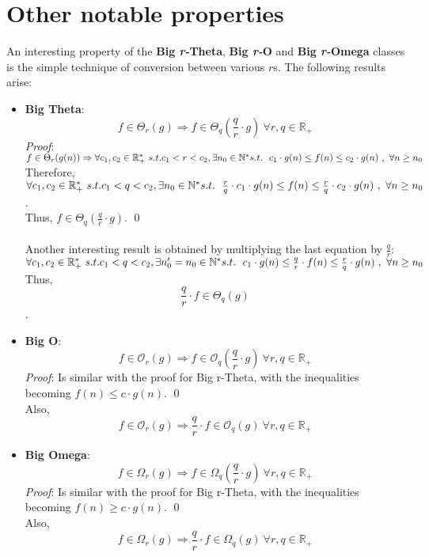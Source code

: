 \section{Other notable properties}
An interesting property of the \textbf{Big \textit{r-}Theta},  \textbf{Big \textit{r-}O} and \textbf{Big \textit{r-}Omega} classes is the simple technique of conversion between various $r$s. The following results arise:
\begin{itemize}
  \item \textbf{Big Theta}: 
 \[  f \in \Theta_{r}(g) \Rightarrow f \in \Theta_{q} \left( \frac{q}{r} \cdot g \right) \ \forall r,q \in \mathbb{R}_{+}\]
\textit{Proof}:
$ f \in \Theta_{r}(g(n)) \Rightarrow \forall c_{1}, c_{2} \in \mathbb{R}^{*}_{+} \ s.t.  c_{1}< r < c_{2} , \exists n_{0} \in \mathbb{N}^{*}\ \\ s.t.\ \ c_{1} \cdot g(n) \leq f(n) \leq c_{2} \cdot g(n)\ ,\  \forall n \geq n_{0} $ \\
Therefore, $\forall c_{1}, c_{2} \in \mathbb{R}^{*}_{+} \ s.t.  c_{1} < q < c_{2} , \exists n_{0} \in \mathbb{N}^{*}\ \\ s.t.\ \ \frac{r}{q} \cdot c_{1} \cdot g(n) \leq f(n) \leq \frac{r}{q} \cdot c_{2} \cdot g(n)\ ,\  \forall n \geq n_{0}$. \\
Thus, $f \in \Theta_{q} \left( \frac{q}{r} \cdot g \right)$.
\qed
\hfill\break
\\ \\
Another interesting result is obtained by multiplying the last equation by $\frac{q}{r}$: \\
$\forall c_{1}, c_{2} \in \mathbb{R}^{*}_{+} \ s.t.  c_{1} < q < c_{2} , \exists n_{0}' = n_{0} \in \mathbb{N}^{*}\ \\ s.t.\ \ c_{1} \cdot g(n) \leq \frac{q}{r} \cdot f(n) \leq \frac{r}{q} \cdot g(n)\ ,\  \forall n \geq n_{0}$ \\
Thus, \[ \frac{q}{r} \cdot f \in \Theta_{q} \left( g \right)\]. \\



  \item \textbf{Big O}:  
  \[  f \in \mathcal{O}_{r}(g) \Rightarrow f \in \mathcal{O}_{q} \left( \frac{q}{r} \cdot g \right) \ \forall r,q \in \mathbb{R}_{+}\]
\textit{Proof}:
Is similar with the proof for Big r-Theta, with the inequalities becoming $f(n) \leq c \cdot g(n)$.
\qed
\hfill\break
 \\
Also, 
  \[  f \in \mathcal{O}_{r}(g) \Rightarrow \frac{q}{r} \cdot f \in \mathcal{O}_{q} \left(  g \right) \ \forall r,q \in \mathbb{R}_{+}\]

  \item \textbf{Big Omega}: 
 \[  f \in \Omega_{r}(g) \Rightarrow f \in \Omega_{q} \left( \frac{q}{r} \cdot g \right) \ \forall r,q \in \mathbb{R}_{+}\]
\textit{Proof}:
Is similar with the proof for Big r-Theta, with the inequalities becoming $f(n) \geq c \cdot g(n)$.
\qed
\hfill\break
 \\
 Also, 
  \[  f \in \Omega_{r}(g) \Rightarrow \frac{q}{r} \cdot f \in \Omega_{q} \left( g \right) \ \forall r,q \in \mathbb{R}_{+}\]

\end{itemize}
 
